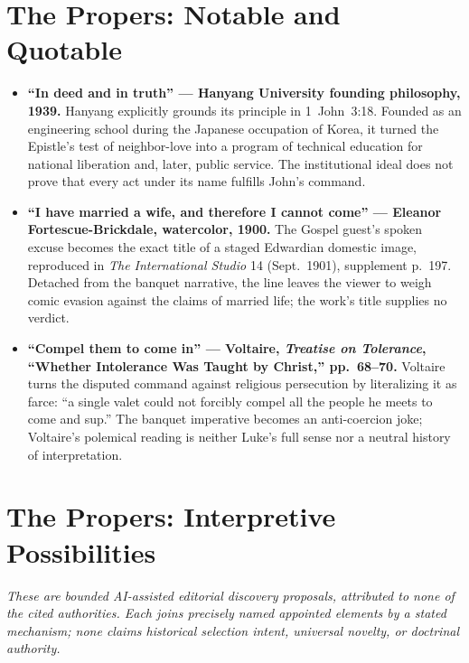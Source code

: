 \section*{The Propers: Notable and Quotable}

{\small
\begin{itemize}
\item \textbf{``In deed and in truth'' --- Hanyang University founding philosophy, 1939.} Hanyang explicitly grounds its principle in 1~John~3:18. Founded as an engineering school during the Japanese occupation of Korea, it turned the Epistle's test of neighbor-love into a program of technical education for national liberation and, later, public service. The institutional ideal does not prove that every act under its name fulfills John's command.

\item \textbf{``I have married a wife, and therefore I cannot come'' --- Eleanor Fortescue-Brickdale, watercolor, 1900.} The Gospel guest's spoken excuse becomes the exact title of a staged Edwardian domestic image, reproduced in \emph{The International Studio} 14 (Sept.~1901), supplement p.~197. Detached from the banquet narrative, the line leaves the viewer to weigh comic evasion against the claims of married life; the work's title supplies no verdict.

\item \textbf{``Compel them to come in'' --- Voltaire, \emph{Treatise on Tolerance}, ``Whether Intolerance Was Taught by Christ,'' pp.~68--70.} Voltaire turns the disputed command against religious persecution by literalizing it as farce: ``a single valet could not forcibly compel all the people he meets to come and sup.'' The banquet imperative becomes an anti-coercion joke; Voltaire's polemical reading is neither Luke's full sense nor a neutral history of interpretation.
\end{itemize}
}

\section*{The Propers: Interpretive Possibilities}

\noindent\emph{These are bounded AI-assisted editorial discovery proposals, attributed to none of the cited authorities. Each joins precisely named appointed elements by a stated mechanism; none claims historical selection intent, universal novelty, or doctrinal authority.}

